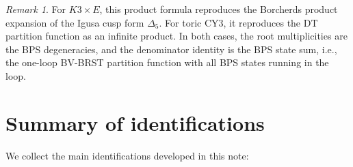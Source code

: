 \documentclass[11pt]{amsart}
\theoremstyle{plain}
\theoremstyle{definition}
\theoremstyle{remark}
\newtheorem{remark}[theorem]{Remark}
\begin{document}
\begin{remark}
For $K3 \times E$, this product formula reproduces the Borcherds product expansion of the Igusa cusp form $\Delta_5$. For toric CY3, it reproduces the DT partition function as an infinite product. In both cases, the root multiplicities are the BPS degeneracies, and the denominator identity is the BPS state sum, i.e., the one-loop BV-BRST partition function with all BPS states running in the loop.
\end{remark}

\section{Summary of identifications}
\label{sec:summary}

We collect the main identifications developed in this note:
\end{document}
